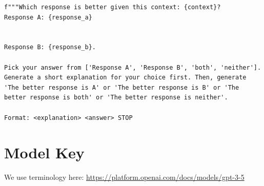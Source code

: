 \begin{listing}[!ht]
\begin{verbatim}
f"""Which response is better given this context: {context}?
Response A: {response_a}


Response B: {response_b}.

Pick your answer from ['Response A', 'Response B', 'both', 'neither']. Generate a short explanation for your choice first. Then, generate 'The better response is A' or 'The better response is B' or 'The better response is both' or 'The better response is neither'.

Format: <explanation> <answer> STOP
\end{verbatim}
\caption{Prompt for GPT-4 evaluation of \responsegen.}
\label{lst:gpt4_eval_response}
\end{listing}



\section{Model Key}

We use terminology here: \url{https://platform.openai.com/docs/models/gpt-3-5}